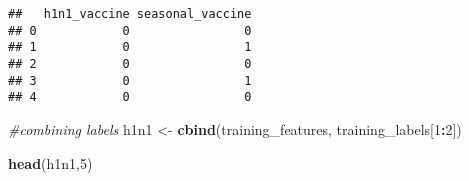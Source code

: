 \documentclass[
]{article}
\newenvironment{Shaded}{\begin{snugshade}}{\end{snugshade}}
\newcommand{\CommentTok}[1]{\textcolor[rgb]{0.56,0.35,0.01}{\textit{#1}}}
\newcommand{\DecValTok}[1]{\textcolor[rgb]{0.00,0.00,0.81}{#1}}
\newcommand{\FunctionTok}[1]{\textcolor[rgb]{0.13,0.29,0.53}{\textbf{#1}}}
\newcommand{\NormalTok}[1]{#1}
\newcommand{\OtherTok}[1]{\textcolor[rgb]{0.56,0.35,0.01}{#1}}
\newcommand{\SpecialCharTok}[1]{\textcolor[rgb]{0.81,0.36,0.00}{\textbf{#1}}}
\begin{document}
\begin{verbatim}
##   h1n1_vaccine seasonal_vaccine
## 0            0                0
## 1            0                1
## 2            0                0
## 3            0                1
## 4            0                0
\end{verbatim}

\begin{Shaded}
\begin{Highlighting}[]
\CommentTok{\#combining labels}
\NormalTok{h1n1 }\OtherTok{\textless{}{-}} \FunctionTok{cbind}\NormalTok{(training\_features, training\_labels[}\DecValTok{1}\SpecialCharTok{:}\DecValTok{2}\NormalTok{])}
\end{Highlighting}
\end{Shaded}

\begin{Shaded}
\begin{Highlighting}[]
\FunctionTok{head}\NormalTok{(h1n1,}\DecValTok{5}\NormalTok{)}
\end{Highlighting}
\end{Shaded}
\end{document}
